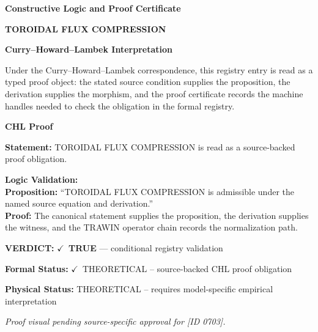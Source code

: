 \clearpage
\begingroup\tzpsupportsetup
\noindent\textbf{\fontsize{10.8pt}{12.8pt}\selectfont [ID 0703] Constructive Logic and Proof Certificate}\par
\noindent\textbf{\fontsize{10pt}{12pt}\selectfont TOROIDAL FLUX COMPRESSION}\par
\vspace{0.45em}
\begingroup
\footnotesize
\setlength{\parskip}{0.22em}
\setlength{\parindent}{0pt}
\noindent\textbf{Curry--Howard--Lambek Interpretation}\par
Under the Curry--Howard--Lambek correspondence, this registry entry is read as a typed proof
object: the stated source condition supplies the proposition, the derivation supplies the
morphism, and the proof certificate records the machine handles needed to check the obligation
in the formal registry.

\vspace{0.45em}
\noindent\textbf{CHL Proof}\par
\textbf{Statement:} TOROIDAL FLUX COMPRESSION is read as a source-backed proof obligation.

\textbf{Logic Validation:}\\
\textbf{Proposition:} ``TOROIDAL FLUX COMPRESSION is admissible under the named source equation and derivation.''\\
\textbf{Proof:} The canonical statement supplies the proposition, the derivation supplies the witness, and the TRAWIN operator chain records the normalization path.

\textbf{VERDICT:} \ensuremath{\checkmark}\ \textbf{TRUE} --- conditional registry validation

\textbf{Formal Status:} \ensuremath{\checkmark}\ THEORETICAL -- source-backed CHL proof obligation

\textbf{Physical Status:} THEORETICAL -- requires model-specific empirical interpretation
\par\vspace{0.45em}
\par
\vfill
\begingroup\footnotesize\itshape
Proof visual pending source-specific approval for [ID 0703].
\par\endgroup
\vfill
\endgroup
\endgroup
